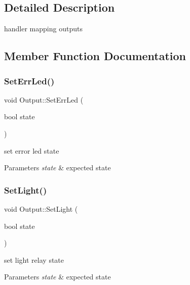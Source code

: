 \subsection{Detailed Description}
handler mapping outputs 

\subsection{Member Function Documentation}
\mbox{\label{class_output_a1e7758e1982620e4c162d171f6c07689}} 
\subsubsection{\texorpdfstring{Set\+Err\+Led()}{SetErrLed()}}
{\footnotesize\ttfamily void Output\+::\+Set\+Err\+Led (\begin{DoxyParamCaption}\item[{bool}]{state }\end{DoxyParamCaption})}



set error led state 


\begin{DoxyParams}{Parameters}
{\em state} & expected state \\
\hline
\end{DoxyParams}
\mbox{\label{class_output_a6da518ba07072a13a7f143d12adc1246}} 
\subsubsection{\texorpdfstring{Set\+Light()}{SetLight()}}
{\footnotesize\ttfamily void Output\+::\+Set\+Light (\begin{DoxyParamCaption}\item[{bool}]{state }\end{DoxyParamCaption})}



set light relay state 


\begin{DoxyParams}{Parameters}
{\em state} & expected state \\
\hline
\end{DoxyParams}
\mbox{\label{class_output_a3e677a7f19fd58a5e62a093f5eb685db}} 
